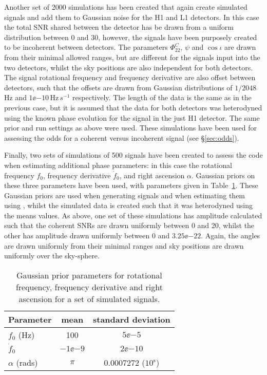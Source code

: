 Another set of 2000 simulations has been created that again create simulated signals and add them to Gaussian noise for the H1 and L1 detectors. In this
case the total SNR shared between the detector has be drawn from a uniform distribution between 0 and 30, however, the signals have been purposely created
to be incoherent between detectors. The parameters $\Phi_{22}^C$, $\psi$ and $\cos{\iota}$ are drawn from their minimal allowed ranges, but are different for
the signals input into the two detectors, whilst the sky positions are also independent for both detectors. The signal rotational frequency and frequency
derivative are also offset between detectors, such that the offsets are drawn from Gaussian distributions of $1/2048$\,Hz and $1\ee{-10}$\,Hz$\,s^{-1}$
respectively. The length of the data is the same as in the previous case, but it is assumed that the data for both detectors was heterodyned using the
known phase evolution for the signal in the just H1 detector. The same prior and run settings as above were used. These simulations have been used for
assessing the odds for a coherent versus incoherent signal (see \S\ref{sec:odds}).

Finally, two sets of simulations of 500 signals have been created to assess the code when estimating additional phase parameters: in this case
the rotational frequency $f_0$, frequency derivative $\dot{f}_0$, and right ascension $\alpha$. Gaussian priors on these three parameters have been
used, with parameters given in Table~\ref{tab:gaussianpriors}. These Gaussian priors are used when generating signals and when estimating them
using \lppen, whilst the simulated data is created such that it was heterodyned using the means values. As above, one set of these simulations has amplitude 
calculated such that the coherent SNRs are drawn uniformly between 0 and 20, whilst the other has amplitude drawn uniformly between 0 and $3.25\ee{-22}$.
Again, the angles are drawn uniformly from their minimal ranges and sky positions are drawn uniformly over the sky-sphere.

\begin{table}[!hptb]
\caption{Gaussian prior parameters for rotational frequency, frequency derivative and right ascension for a set of simulated signals.
\label{tab:gaussianpriors}}
\begin{center}
\begin{tabular}{l | c c}
\hline
Parameter & mean & standard deviation \\                      
\hline
\hline
$f_0$ (Hz) & 100 & $5\ee{-5}$ \\
$\dot{f}_0$ & $-1\ee{-9}$ & $2\ee{-10}$ \\
$\alpha$ (rads) & $\pi$ & $0.0007272$ ($10^{\text{s}}$) \\
\hline
\end{tabular}
\end{center}
\end{table}

